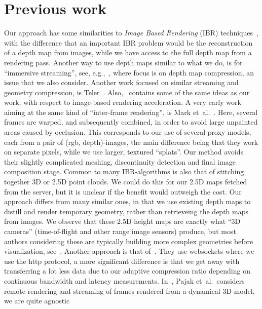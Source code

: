 \documentclass[10pt,conference,compsocconf]{IEEEtran}
\newcommand{\eg}{{e.g.}}
\newcommand{\etal}{{et~al.}}
\begin{document}
\section{Previous work}
\label{sec:prevWork}

Our approach has some similarities to {\em Image Based Rendering} (IBR)
techniques~\cite{journalsritaOliveira02}, with the difference that an
important IBR problem would be the reconstruction of a depth map from images,
while we have access to the full depth map from a rendering pass.  Another way
to use depth maps similar to what we do, is for ``immersive streaming'', see,
\eg,~\cite{ibr}, where focus is on depth map compression, an issue that we also
consider. Another work focused on similar streaming and geometry compression,
is Teler~\cite{teler}. Also,~\cite{220764} contains some of the same ideas as our
work, with respect to image-based rendering acceleration.
%
A very early work aiming at the same kind of ``inter-frame rendering'', is
Mark \etal~\cite{Mark:1997:PW:253284.253292}. Here, several frames are warped,
and subsequently combined, in order to avoid large unpainted areas caused by
occlusion. This corresponds to our use of several proxy models, each from a pair
of (rgb, depth)-images, the main difference being that they work on separate
pixels, while we use larger, textured ``splats''. Our method avoids their
slightly complicated meshing, discontinuity detection and final image
composition stage.
%
Common to many IBR-algorithms is also that of stitching together 3D or 2.5D
point clouds. We could do this for our 2.5D maps fetched from the server, but it
is unclear if the benefit would outweigh the cost.
%
Our approach differs from many similar ones, in that we use existing depth maps 
to distill and render temporary geometry, rather than retrieveing the depth maps from images.
%
We observe that these 2.5D height maps are exactly what ``3D cameras''
(time-of-flight and other range image sensors) produce, but most authors
considering these are typically building more complex geometries before
visualization, see~\cite{IMM2009-05801}.
%
Another approach is that of~\cite{altenhofen16rixels}. They use websockets
where we use the http protocol, a more significant difference is that we get
away with transferring a lot less data due to our adaptive compression ratio
depending on continuous bandwidth and latency measurements.
%
In~\cite{CGF:CGF1871}, Pajak \etal~considers remote rendering and
streaming of frames rendered from a dynamical 3D model, we are quite agnostic
\end{document}
